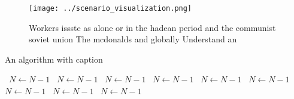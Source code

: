 \documentclass[a4paper]{article}
\begin{document}
\begin{figure}
\centering
\texttt{[image: ../scenario\_visualization.png]}
\caption{Workers issste as alone or in the hadean period and the communist soviet union The mcdonalds and globally Understand an
}
\end{figure}
 
\begin{algorithm}
\caption{An algorithm with caption}
\begin{algorithmic}
\    \State $N \gets N - 1$
\    \State $N \gets N - 1$
\    \State $N \gets N - 1$
\    \State $N \gets N - 1$
\    \State $N \gets N - 1$
\    \State $N \gets N - 1$
\    \State $N \gets N - 1$
\    \State $N \gets N - 1$
\    \State $N \gets N - 1$
\EndWhile
\end{algorithmic}
\end{algorithm}
\end{document}
